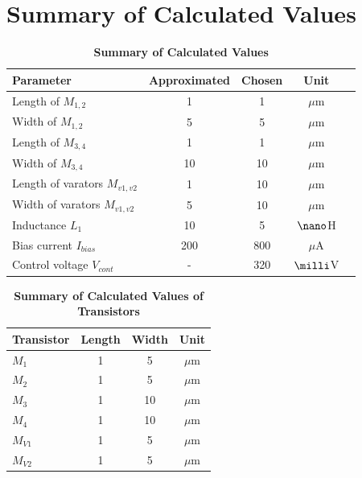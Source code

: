 \section{Summary of Calculated Values}

\begin{table}[h]
    \centering
        {\captionsetup{justification=centering}\caption*{\textbf{Summary of Calculated Values} }}
    \renewcommand{\arraystretch}{1.2} %
    \begin{tabular}{lcccc} %
        \toprule
        \textbf{Parameter}& \textbf{Approximated} & \textbf{Chosen} & \textbf{Unit} \\
        \midrule
        Length of $M_{1,2}$& 1& 1 & $\mu$m \\
        Width of $M_{1,2}$ & 5 & 5 & $\mu$m \\
        Length of $M_{3,4}$& 1& 1 & $\mu$m \\
        Width of $M_{3,4}$ & 10 & 10 & $\mu$m \\
        Length of varators $M_{v1,v2}$& 1 & 10& $\mu$m \\
        Width of varators $M_{v1,v2}$ & 5 & 10 & $\mu$m \\
        Inductance $L_{1}$ & 10 & 5 & $\nano$H\\
        Bias current $I_{bias}$ & 200 & 800 & $\mu$A \\  
        Control voltage $V_{cont}$ & - & 320 & $\milli$V \\   
        \bottomrule
    \end{tabular}
    \label{tab:summary_values}
\end{table}

\begin{table}[h]
    \centering
    \captionsetup{justification=centering} %
    \caption*{\textbf{Summary of Calculated Values of Transistors}} %
    \renewcommand{\arraystretch}{1.2} %
    \begin{tabular}{lccc} %
        \toprule
        \textbf{Transistor} & \textbf{Length} & \textbf{Width} & \textbf{Unit} \\
        \midrule
        $M_1$ & 1 & 5 & $\mu$m  \\
        $M_2$ & 1 & 5 & $\mu$m \\
        $M_3$ & 1 & 10 & $\mu$m  \\
        $M_4$ & 1 & 10 & $\mu$m  \\
        $M_{V1}$ & 1 & 5 & $\mu$m  \\
        $M_{V2}$ & 1 & 5 & $\mu$m \\
        \bottomrule
    \end{tabular}
    \label{tab:summary_values} %
\end{table}



\endinput